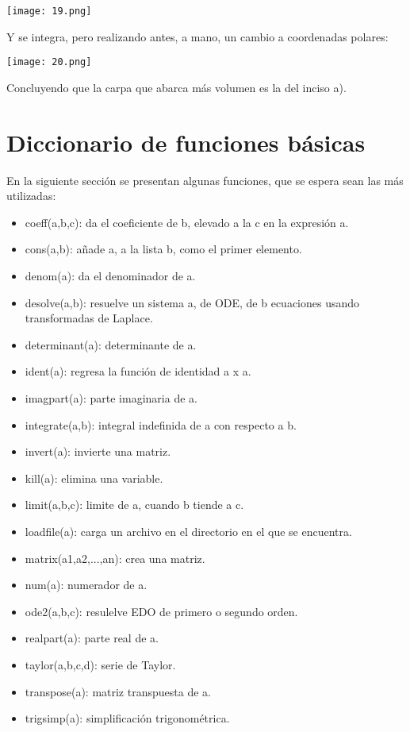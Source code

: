 \documentclass[12pt]{article}
\begin{document}
 \begin{center}
 \texttt{[image: 19.png]}
 \end{center}
 
 Y se integra, pero realizando antes, a mano, un cambio a coordenadas polares: 
 
 \begin{center}
 \texttt{[image: 20.png]}
 \end{center}

Concluyendo que la carpa que abarca más volumen es la del inciso a). 
\section{Diccionario de funciones básicas}

En la siguiente sección se presentan algunas funciones, que se espera sean las más utilizadas: 

\begin{itemize} 
\item coeff(a,b,c): da el coeficiente de b, elevado a la c en la expresión a.
\item cons(a,b): añade a, a la lista b, como el primer elemento.
\item denom(a): da el denominador de a. 
\item desolve(a,b): resuelve un sistema a, de ODE, de b ecuaciones usando transformadas de Laplace.
\item determinant(a): determinante de a. 
\item ident(a): regresa la función de identidad a x a. 
\item imagpart(a): parte imaginaria de a. 
\item integrate(a,b): integral indefinida de a con respecto a b. 
\item invert(a): invierte una matriz. 
\item kill(a): elimina una variable.
\item limit(a,b,c): limite de a, cuando b tiende a c.
\item loadfile(a): carga un archivo en el directorio en el que se encuentra. 
\item matrix(a1,a2,...,an): crea una matriz. 
\item num(a): numerador de a.
\item ode2(a,b,c): resulelve EDO de primero o segundo orden.
\item realpart(a): parte real de a. 
\item taylor(a,b,c,d): serie de Taylor.
\item transpose(a): matriz transpuesta de a.
\item trigsimp(a): simplificación trigonométrica.
\end{itemize}
\end{document}
